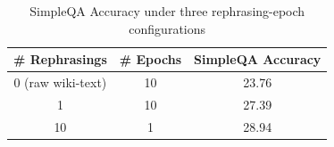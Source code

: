 \begin{table}[htbp]
\centering
\caption{SimpleQA Accuracy under three rephrasing-epoch configurations}
\label{tab:rewrites_epochs_f1}
\begin{tabular}{ccc}
\toprule
\# Rephrasings & \# Epochs & SimpleQA Accuracy \\
\midrule
0 (raw wiki-text) & 10 & 23.76 \\
1            & 10 & 27.39 \\
10           & 1  & 28.94 \\
\bottomrule
\end{tabular}
\end{table}